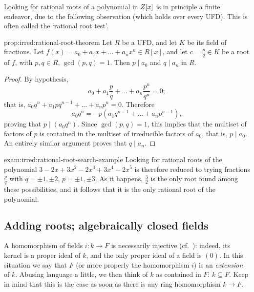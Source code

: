 Looking for rational roots of a polynomial in $Z[x]$ is in principle
a finite endeavor, due to the following observation (which holds over
every UFD). This is often called the `rational root test'.
\begin{prop}{}{prop:irred:rational-root-theorem}
  Let $R$ be a UFD, and let $K$ be its field of fractions. Let
  $f(x) = a_0 + a_1 x + \dots + a_n x^n \in R[x]$, and let
  $c = \frac{p}{q} \in K$ be a root of $f$, with $p, q \in R$,
  $\gcd(p, q) = 1$. Then $p \mid a_0$ and $q \mid a_n$ in $R$.
\end{prop}
\begin{proof}
  By hypothesis,
  \[
    a_0 + a_1 \frac{p}{q} + \dots + a_n \frac{p^n}{q^n} = 0;
  \]
  that is, $a_0 q^n + a_1 p q^{n-1} + \dots + a_n p^n = 0$. Therefore
  \[
    a_0 q^n = -p(a_1 q^{n-1} + \dots + a_n p^{n-1}),
  \]
  proving that $p \mid (a_0 q^n)$. Since $\gcd(p, q) = 1$, this
  implies that the multiset of factors of $p$ is contained in the
  multiset of irreducible factors of $a_0$, that is, $p \mid a_0$. An
  entirely similar argument proves that $q \mid a_n$.
\end{proof}
\begin{exam}{}{exam:irred:rational-root-search-example}
  Looking for rational roots of the polynomial
  $3 - 2x + 3x^2 - 2x^3 + 3x^4 - 2x^5$ is therefore reduced to trying
  fractions $\frac{p}{q}$ with $q = \pm 1, \pm 2$, $p = \pm 1, \pm 3$.
  As it happens, $\frac{3}{2}$ is the only root found among these
  possibilities, and it follows that it is the only rational root of
  the polynomial.
\end{exam}

\subsection{Adding roots; algebraically closed fields}
\label{subsec:irred:adding-roots-algebraically-closed-fields}
A homomorphism of fields $i : k \to F$ is necessarily injective (cf.\
): indeed, its kernel is a proper
ideal of $k$, and the only proper ideal of a field is $(0)$. In this
situation we say that $F$ (or more properly the homomorphism $i$) is
an \emph{extension} of $k$. Abusing language a little, we then think
of $k$ as contained in $F$: $k \subseteq F$. Keep in mind that this is
the case as soon as there is any ring homomorphism $k \to F$.

